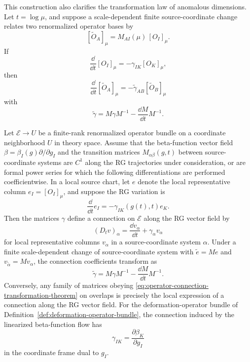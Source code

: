 This construction also clarifies the transformation law of anomalous
dimensions.  Let \(t=\log\mu\), and suppose a scale-dependent finite
source-coordinate change relates two renormalized operator bases by
\[
  [\widetilde O_A]_\mu
  =
  M_{AI}(\mu)\,[O_I]_\mu .
\]
If
\[
  \frac{\dd}{\dd t}[O_I]_\mu
  =
  -\gamma_{IK}[O_K]_\mu,
\]
then
\[
  \frac{\dd}{\dd t}[\widetilde O_A]_\mu
  =
  -
  \widetilde\gamma_{AB}
  [\widetilde O_B]_\mu
\]
with
\begin{equation}
  \widetilde\gamma
  =
  M\gamma M^{-1}
  -
  \frac{\dd M}{\dd t}M^{-1}.
  \label{eq:operator-anomalous-dimension-connection-law}
\end{equation}

\begin{theorem}
\label{thm:anomalous-dimensions-rg-connection}
Let \(\mathcal E\to U\) be a finite-rank renormalized operator bundle on a
coordinate neighborhood \(U\) in theory space.  Assume that the beta-function
vector field \(\beta=\beta_I(g)\partial/\partial g_I\) and the transition
matrices \(M_{\alpha\beta}(g,t)\) between source-coordinate systems are \(C^1\) along the
RG trajectories under consideration, or are formal power series for which the
following differentiations are performed coefficientwise.  In a local source
chart, let \(e\) denote the local representative column
\(e_I=[O_I]_\mu\), and suppose the RG variation is
\begin{equation}
  \frac{\dd}{\dd t}e_I
  =
  -\gamma_{IK}(g(t),t)e_K .
  \label{eq:operator-frame-parallel-transport}
\end{equation}
Then the matrices \(\gamma\) define a connection on \(\mathcal E\) along the
RG vector field by
\begin{equation}
  (D_t v)_\alpha
  =
  \frac{\dd v_\alpha}{\dd t}+\gamma_\alpha v_\alpha
  \label{eq:operator-bundle-rg-connection}
\end{equation}
for local representative columns \(v_\alpha\) in a source-coordinate system \(\alpha\).
Under a finite scale-dependent change of source-coordinate system with
\(\widetilde e=M e\) and \(v_{\widetilde\alpha}=M v_\alpha\), the connection
coefficients transform as
\begin{equation}
  \widetilde\gamma
  =
  M\gamma M^{-1}
  -
  \frac{\dd M}{\dd t}M^{-1}.
  \label{eq:operator-connection-transformation-theorem}
\end{equation}
Conversely, any family of matrices obeying
\eqref{eq:operator-connection-transformation-theorem} on overlaps is precisely
the local expression of a connection along the RG vector field.  For the
deformation-operator bundle of Definition~\ref{def:deformation-operator-bundle},
the connection induced by the linearized beta-function flow has
\begin{equation}
  \gamma_{IK}
  =
  \frac{\partial\beta_K}{\partial g_I}
  \label{eq:cotangent-rg-connection-jacobian}
\end{equation}
in the coordinate frame dual to \(g_I\).
\end{theorem}

